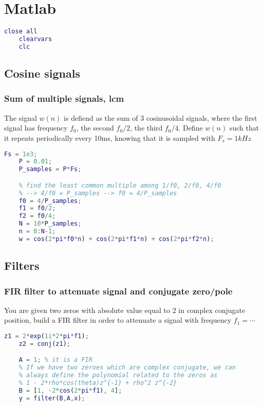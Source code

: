 
\section{Matlab}

\begin{lstlisting}[language=Matlab, escapeinside=`']
    close all
    clearvars
    clc
\end{lstlisting}

\subsection{Cosine signals}

\subsubsection{Sum of multiple signals, lcm}
The signal $w(n)$ is defiend as the sum of 3 cosinusoidal signals, where the first signal has frequency $f_0$, the second $f_0/2$, the third $f_0/4$. Define $w(n)$ such that it repeats periodically every 10ms, knowing that it is sampled with $F_s=1kHz$
\begin{lstlisting}[language=Matlab, escapeinside=`']
    Fs = 1e3;
    P = 0.01;
    P_samples = P*Fs;

    % find the least common multiple among 1/f0, 2/f0, 4/f0
    % --> 4/f0 = P_samples --> f0 = 4/P_samples
    f0 = 4/P_samples;
    f1 = f0/2;
    f2 = f0/4;
    N = 10*P_samples;
    n = 0:N-1;
    w = cos(2*pi*f0*n) + cos(2*pi*f1*n) + cos(2*pi*f2*n);
\end{lstlisting}

\subsection{Filters}

\subsubsection{FIR filter to attenuate signal and conjugate zero/pole}
You are given two zeros with absolute value equal to 2 in complex conjugate position, build a FIR filter in order to attenuate a signal with frequency $f_1=\cdots$
\begin{lstlisting}[language=Matlab, escapeinside=`']
    z1 = 2*exp(1i*2*pi*f1);
    z2 = conj(z1);

    A = 1; % it is a FIR
    % If we have two zeroes which are complex conjugate, we can
    % always define the polynomial related to the zeros as
    % 1 - 2*rho*cos(theta)z^{-1} + rho^2 z^{-2}
    B = [1, -2*cos(2*pi*f1), 4];
    y = filter(B,A,x);
\end{lstlisting}
